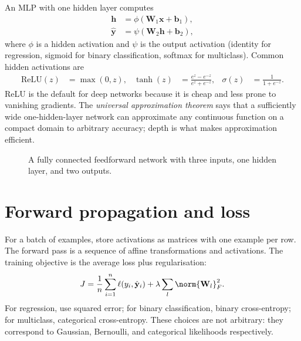 \documentclass[a4paper, 12pt]{book}
\begin{document}
An MLP with one hidden layer computes
\begin{align}
    \mathbf{h} &= \phi(\mathbf{W}_1\mathbf{x}+\mathbf{b}_1),\\
    \hat{\mathbf{y}} &= \psi(\mathbf{W}_2\mathbf{h}+\mathbf{b}_2),
\end{align}
where $\phi$ is a hidden activation and $\psi$ is the output activation (identity for
regression, sigmoid for binary classification, softmax for multiclass). Common hidden
activations are
\begin{align}
    \mathrm{ReLU}(z) &= \max(0,z), &
    \tanh(z) &= \frac{e^z-e^{-z}}{e^z+e^{-z}}, &
    \sigma(z) &= \frac{1}{1+e^{-z}}.
\end{align}
ReLU is the default for deep networks because it is cheap and less prone to vanishing
gradients. The \emph{universal approximation theorem} says that a sufficiently wide
one-hidden-layer network can approximate any continuous function on a compact domain
to arbitrary accuracy; depth is what makes approximation efficient.

\begin{figure}[htbp]
\centering
{}
\caption{A fully connected feedforward network with three inputs, one hidden layer,
and two outputs.}
\label{fig:mlp}
\end{figure}

\section{Forward propagation and loss}

For a batch of examples, store activations as matrices with one example per row. The
forward pass is a sequence of affine transformations and activations. The training
objective is the average loss plus regularisation:
\begin{align}
    J = \frac{1}{n}\sum_{i=1}^n \ell(y_i,\hat{\mathbf{y}}_i)
    + \lambda\sum_{l}\norm{\mathbf{W}_l}_F^2.
\end{align}
For regression, use squared error; for binary classification, binary cross-entropy;
for multiclass, categorical cross-entropy. These choices are not arbitrary: they
correspond to Gaussian, Bernoulli, and categorical likelihoods respectively.
\end{document}
